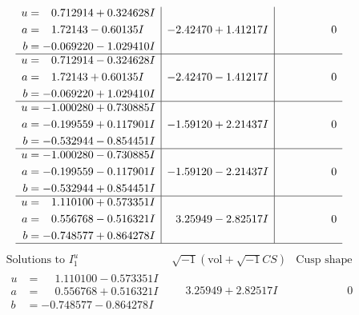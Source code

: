 \documentclass[1p]{elsarticle_modified}
\theoremstyle{definition}
\newcommand{\I}{\sqrt{-1}}
\begin{document}
$$\begin{array}{c|c|c}
\begin{aligned}
u &= \phantom{-}0.712914 + 0.324628 I \\
a &= \phantom{-}1.72143 - 0.60135 I \\
b &= -0.069220 - 1.029410 I\end{aligned}
 & -2.42470 + 1.41217 I & \phantom{-0.000000 } 0 \\ \hline\begin{aligned}
u &= \phantom{-}0.712914 - 0.324628 I \\
a &= \phantom{-}1.72143 + 0.60135 I \\
b &= -0.069220 + 1.029410 I\end{aligned}
 & -2.42470 - 1.41217 I & \phantom{-0.000000 } 0 \\ \hline\begin{aligned}
u &= -1.000280 + 0.730885 I \\
a &= -0.199559 + 0.117901 I \\
b &= -0.532944 - 0.854451 I\end{aligned}
 & -1.59120 + 2.21437 I & \phantom{-0.000000 } 0 \\ \hline\begin{aligned}
u &= -1.000280 - 0.730885 I \\
a &= -0.199559 - 0.117901 I \\
b &= -0.532944 + 0.854451 I\end{aligned}
 & -1.59120 - 2.21437 I & \phantom{-0.000000 } 0 \\ \hline\begin{aligned}
u &= \phantom{-}1.110100 + 0.573351 I \\
a &= \phantom{-}0.556768 - 0.516321 I \\
b &= -0.748577 + 0.864278 I\end{aligned}
 & \phantom{-}3.25949 - 2.82517 I & \phantom{-0.000000 } 0\\
 \hline 
 \end{array}$$\newpage$$\begin{array}{c|c|c}  
\text{Solutions to }I^u_{1}& \I (\text{vol} + \sqrt{-1}CS) & \text{Cusp shape}\\
 \hline 
\begin{aligned}
u &= \phantom{-}1.110100 - 0.573351 I \\
a &= \phantom{-}0.556768 + 0.516321 I \\
b &= -0.748577 - 0.864278 I\end{aligned}
 & \phantom{-}3.25949 + 2.82517 I & \phantom{-0.000000 } 0 \\ \hline\begin{aligned}

\end{aligned}
\end{array}$$
\end{document}
